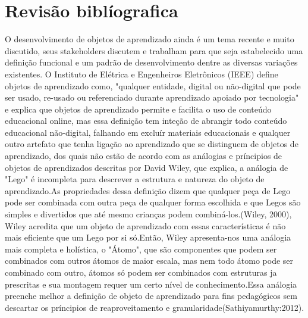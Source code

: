 \documentclass[12pt,openright,oneside,a4paper,english,french,spanish,brazil]{unifil}
\begin{document}
\chapter{Revisão biblíografica}%

O desenvolvimento de objetos de aprendizado ainda é um tema recente e muito discutido, seus stakeholders  discutem e trabalham para que seja estabelecido uma definição funcional e um padrão de desenvolvimento dentre  as diversas variações existentes. O Instituto de Elétrica e Engenheiros Eletrônicos (IEEE)  define objetos de aprendizado como, "qualquer entidade, digital ou não-digital que pode ser usado, re-usado ou referenciado durante aprendizado apoiado por tecnologia" e explica que objetos de aprendizado permite e facilita o uso de conteúdo educacional online, mas essa definição tem inteção de abrangir todo conteúdo educacional não-digital, falhando em excluír materiais educacionais e qualquer outro artefato que tenha ligação ao aprendizado que se distinguem de objetos de aprendizado, dos quais não estão de acordo com as análogias e príncipios de objetos de aprendizados descritas por David Wiley, que explica, a análogia de "Lego" é incompleta para descrever a estrutura e natureza do objeto de aprendizado.As propriedades dessa definição dizem que qualquer peça de Lego pode ser combinada com outra peça de qualquer forma escolhida e que Legos são simples e divertidos que até mesmo crianças podem combiná-los.(Wiley, 2000), Wiley acredita que um objeto de aprendizado com essas características é não mais eficiente que um Lego por si só.Então, Wiley apresenta-nos uma análogia mais completa e holística, o "Átomo", que são componentes que podem ser combinados com outros átomos de maior escala, mas nem todo átomo pode ser combinado com outro, átomos só podem ser combinados com estruturas ja prescritas e sua montagem requer um certo nível de conhecimento.Essa análogia preenche melhor a definição de objeto de aprendizado para fins pedagógicos sem descartar os príncipios de reaproveitamento e granularidade(Sathiyamurthy:2012).

\end{document}
